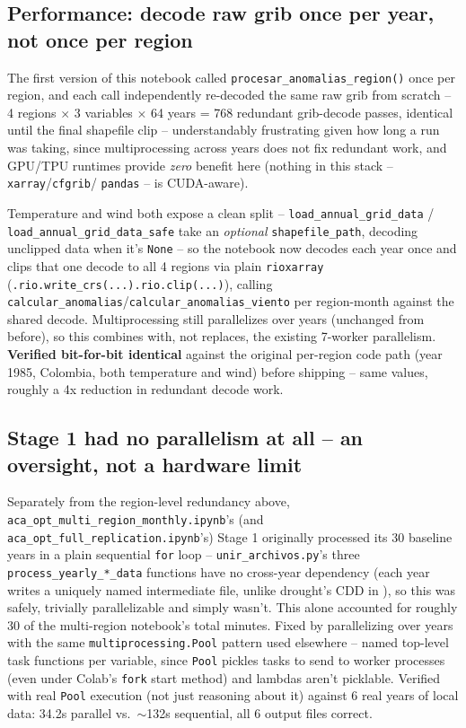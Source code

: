 \documentclass[11pt]{article}
\begin{document}
\subsection{Performance: decode raw grib once per year, not once per
region}

The first version of this notebook called
\texttt{procesar\_anomalias\_region()} once per region, and each call
independently re-decoded the same raw grib from scratch -- 4 regions
$\times$ 3 variables $\times$ 64 years = 768 redundant grib-decode passes,
identical until the final shapefile clip -- understandably frustrating
given how long a run was taking, since multiprocessing across years does
not fix redundant work, and GPU/TPU runtimes provide \emph{zero} benefit
here (nothing in this stack -- \texttt{xarray}/\texttt{cfgrib}/
\texttt{pandas} -- is CUDA-aware).

Temperature and wind both expose a clean split --
\texttt{load\_annual\_grid\_data} / \texttt{load\_annual\_grid\_data\_safe}
take an \emph{optional} \texttt{shapefile\_path}, decoding unclipped data
when it's \texttt{None} -- so the notebook now decodes each year once and
clips that one decode to all 4 regions via plain \texttt{rioxarray}
(\texttt{.rio.write\_crs(...).rio.clip(...)}), calling
\texttt{calcular\_anomalias}/\texttt{calcular\_anomalias\_viento} per
region-month against the shared decode. Multiprocessing still parallelizes
over years (unchanged from before), so this combines with, not replaces,
the existing 7-worker parallelism. \textbf{Verified bit-for-bit identical}
against the original per-region code path (year 1985, Colombia, both
temperature and wind) before shipping -- same values, roughly a 4x
reduction in redundant decode work.

\subsection{Stage 1 had no parallelism at all -- an oversight, not a
hardware limit}

Separately from the region-level redundancy above,
\texttt{aca\_opt\_multi\_region\_monthly.ipynb}'s (and
\texttt{aca\_opt\_full\_replication.ipynb}'s) Stage 1 originally processed
its 30 baseline years in a plain sequential \texttt{for} loop --
\texttt{unir\_archivos.py}'s three \texttt{process\_yearly\_*\_data}
functions have no cross-year dependency (each year writes a uniquely
named intermediate file, unlike drought's CDD in
), so this was safely, trivially parallelizable and
simply wasn't. This alone accounted for roughly 30 of the multi-region
notebook's total minutes. Fixed by parallelizing over years with the same
\texttt{multiprocessing.Pool} pattern used elsewhere -- named top-level
task functions per variable, since \texttt{Pool} pickles tasks to send to
worker processes (even under Colab's \texttt{fork} start method) and
lambdas aren't picklable. Verified with real \texttt{Pool} execution (not
just reasoning about it) against 6 real years of local data: 34.2s
parallel vs.\ $\sim$132s sequential, all 6 output files correct.
\end{document}
